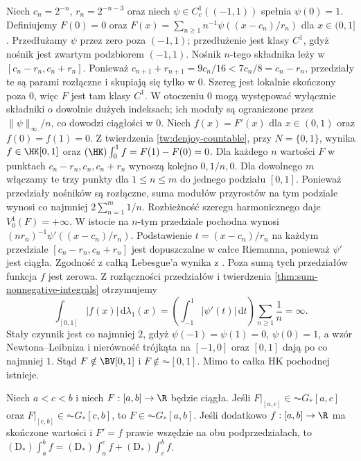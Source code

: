 \begin{przyklad}
Niech $c_n=2^{-n}$, $r_n=2^{-n-3}$ oraz niech $\psi\in C_c^1((-1,1))$ spełnia $\psi(0)=1$. Definiujemy
$F(0)=0$ oraz $F(x)=\sum_{n\ge1}n^{-1}\psi((x-c_n)/r_n)$ dla $x\in(0,1]$. Przedłużamy $\psi$ przez zero poza $(-1,1)$; przedłużenie jest klasy $C^1$, gdyż nośnik jest zwartym podzbiorem $(-1,1)$. Nośnik $n$-tego składnika leży w $[c_n-r_n,c_n+r_n]$. Ponieważ $c_{n+1}+r_{n+1}=9c_n/16<7c_n/8=c_n-r_n$, przedziały te są parami rozłączne i skupiają się tylko w $0$. Szereg jest lokalnie skończony poza $0$, więc $F$ jest tam klasy $C^1$. W otoczeniu $0$ mogą występować wyłącznie składniki o dowolnie dużych indeksach; ich moduły są ograniczone przez $\|\psi\|_\infty/n$, co dowodzi ciągłości w $0$. Niech $f(x)=F'(x)$ dla $x\in(0,1)$ oraz $f(0)=f(1)=0$.
Z twierdzenia \ref{tw:denjoy-countable}, przy $N=\{0,1\}$,
wynika $f\in\HK[0,1]$ oraz $(\HK)\int_0^1f=F(1)-F(0)=0$.
Dla każdego $n$ wartości $F$ w punktach $c_n-r_n,c_n,c_n+r_n$
wynoszą kolejno $0,1/n,0$. Dla dowolnego $m$ włączamy te trzy
punkty dla $1\le n\le m$ do jednego podziału $[0,1]$.
Ponieważ przedziały nośników są rozłączne, suma modułów
przyrostów na tym podziale wynosi co najmniej
$2\sum_{n=1}^m1/n$. Rozbieżność szeregu harmonicznego
daje $V_0^1(F)=+\infty$. W istocie na $n$-tym przedziale pochodna wynosi $(nr_n)^{-1}\psi'((x-c_n)/r_n)$. Podstawienie $t=(x-c_n)/r_n$ na każdym przedziale
$[c_n-r_n,c_n+r_n]$ jest dopuszczalne w całce Riemanna,
ponieważ $\psi'$ jest ciągła. Zgodność z całką Lebesgue'a
wynika z .
Poza sumą tych przedziałów funkcja $f$ jest zerowa.
Z rozłączności przedziałów i twierdzenia
\ref{thm:sum-nonnegative-integrals} otrzymujemy
\[
 \int_{[0,1]}|f(x)|\,\mathrm d\lambda_1(x)
 =\left(\int_{-1}^1|\psi'(t)|\,\mathrm dt\right)\sum_{n\ge1}\frac1n=\infty.
\]
Stały czynnik jest co najmniej $2$, gdyż $\psi(-1)=\psi(1)=0$, $\psi(0)=1$, a wzór Newtona--Leibniza i nierówność trójkąta na $[-1,0]$ oraz $[0,1]$ dają po co najmniej $1$. Stąd $F\notin\BV[0,1]$ i $F\notin\AC[0,1]$. Mimo to całka HK pochodnej istnieje.
\end{przyklad}
\begin{stwierdzenie}\label{ma1:kh:st:denjoy-sklejanie}\label{st:denjoy-sklejanie}
Niech $a<c<b$ i niech $F:[a,b]\to\R$ będzie ciągła. Jeśli $F|_{[a,c]}\in\AC G_*[a,c]$ oraz $F|_{[c,b]}\in\AC G_*[c,b]$, to $F\in\AC G_*[a,b]$. Jeśli dodatkowo $f:[a,b]\to\R$ ma skończone wartości i $F'=f$ prawie wszędzie na obu podprzedziałach, to $(\mathrm D_*)\int_a^b f=(\mathrm D_*)\int_a^c f+(\mathrm D_*)\int_c^b f$.
\end{stwierdzenie}
